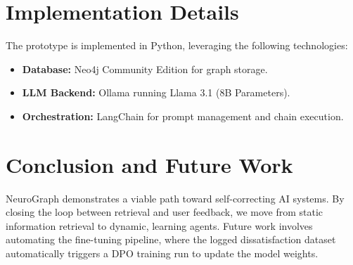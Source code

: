 \documentclass[a4paper,12pt]{article}
\begin{document}
\section{Implementation Details}
The prototype is implemented in Python, leveraging the following technologies:
\begin{itemize}
    \item \textbf{Database:} Neo4j Community Edition for graph storage.
    \item \textbf{LLM Backend:} Ollama running Llama 3.1 (8B Parameters).
    \item \textbf{Orchestration:} LangChain for prompt management and chain execution.
\end{itemize}

\section{Conclusion and Future Work}
NeuroGraph demonstrates a viable path toward self-correcting AI systems. By closing the loop between retrieval and user feedback, we move from static information retrieval to dynamic, learning agents. Future work involves automating the fine-tuning pipeline, where the logged dissatisfaction dataset automatically triggers a DPO training run to update the model weights.
\end{document}
